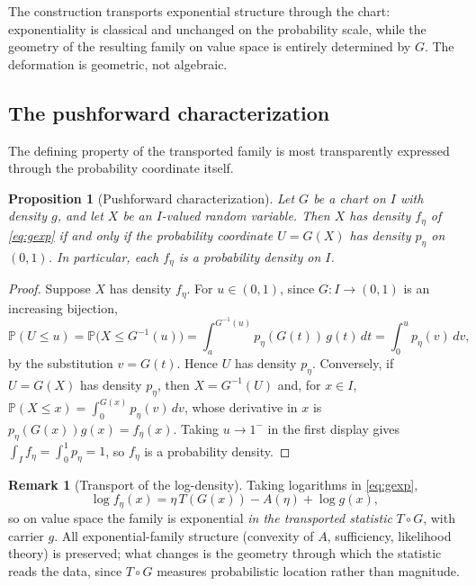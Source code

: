 \documentclass[11pt]{article}
\newtheorem{proposition}[theorem]{Proposition}
\theoremstyle{definition}
\newtheorem{remark}[theorem]{Remark}
\newcommand{\Prob}{\mathbb{P}}
\begin{document}
The construction transports exponential structure through the chart:
exponentiality is classical and unchanged on the probability scale, while
the geometry of the resulting family on value space is entirely determined
by $G$. The deformation is geometric, not algebraic.

\subsection{The pushforward characterization}

The defining property of the transported family is most transparently
expressed through the probability coordinate itself.

\begin{proposition}[Pushforward characterization]\label{prop:pushforward}
Let $G$ be a chart on $I$ with density $g$, and let $X$ be an $I$-valued
random variable. Then $X$ has density $f_\eta$ of \eqref{eq:gexp} if and
only if the probability coordinate $U=G(X)$ has density $p_\eta$ on
$(0,1)$. In particular, each $f_\eta$ is a probability density on $I$.
\end{proposition}

\begin{proof}
Suppose $X$ has density $f_\eta$. For $u\in(0,1)$, since $G:I\to(0,1)$ is
an increasing bijection,
\[
\Prob(U\le u)
=\Prob\bigl(X\le G^{-1}(u)\bigr)
=\int_a^{G^{-1}(u)}p_\eta(G(t))\,g(t)\,dt
=\int_0^u p_\eta(v)\,dv,
\]
by the substitution $v=G(t)$. Hence $U$ has density $p_\eta$. Conversely,
if $U=G(X)$ has density $p_\eta$, then $X=G^{-1}(U)$ and, for $x\in I$,
$\Prob(X\le x)=\int_0^{G(x)}p_\eta(v)\,dv$, whose derivative in $x$ is
$p_\eta(G(x))g(x)=f_\eta(x)$. Taking $u\to1^-$ in the first display gives
$\int_I f_\eta=\int_0^1 p_\eta=1$, so $f_\eta$ is a probability density.
\end{proof}

\begin{remark}[Transport of the log-density]\label{rem:transport-log}
Taking logarithms in \eqref{eq:gexp},
\[
\log f_\eta(x)=\eta\,T(G(x))-A(\eta)+\log g(x),
\]
so on value space the family is exponential \emph{in the transported
statistic} $T\circ G$, with carrier $g$. All exponential-family structure
(convexity of $A$, sufficiency, likelihood theory) is preserved; what
changes is the geometry through which the statistic reads the data, since
$T\circ G$ measures probabilistic location rather than magnitude.
\end{remark}
\end{document}
